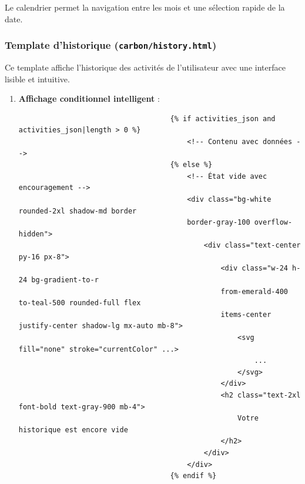 \documentclass[a4paper,11pt]{article}
\begin{document}
\begin{enumerate}
                            \noindent Le calendrier permet la navigation entre les mois et une sélection rapide de la date.
                    \end{enumerate}

                \subsubsection{Template d'historique (\texttt{carbon/history.html})}
                    \noindent Ce template affiche l'historique des activités de l'utilisateur avec une interface lisible et intuitive.

                    \begin{enumerate}
                        \item \textbf{Affichage conditionnel intelligent} :
                            \begin{tcolorbox}[colback=lightgray!5, colframe=gray!80, left=-70mm, right=5mm, top=2mm, bottom=0mm, boxrule=0.1mm]
                                \begin{verbatim}
                                    {% if activities_json and activities_json|length > 0 %}
                                        <!-- Contenu avec données -->
                                    {% else %}
                                        <!-- État vide avec encouragement -->
                                        <div class="bg-white rounded-2xl shadow-md border 
                                        border-gray-100 overflow-hidden">
                                            <div class="text-center py-16 px-8">
                                                <div class="w-24 h-24 bg-gradient-to-r 
                                                from-emerald-400 to-teal-500 rounded-full flex 
                                                items-center justify-center shadow-lg mx-auto mb-8">
                                                    <svg fill="none" stroke="currentColor" ...>
                                                        ...
                                                    </svg>
                                                </div>
                                                <h2 class="text-2xl font-bold text-gray-900 mb-4">
                                                    Votre historique est encore vide
                                                </h2>
                                            </div>
                                        </div>
                                    {% endif %}
                                \end{verbatim}
                            \end{tcolorbox}


\end{enumerate}
\end{document}
